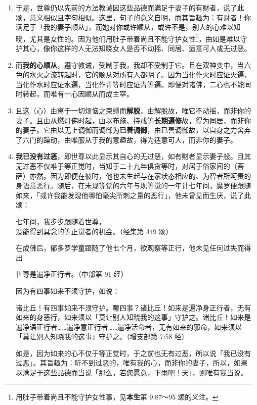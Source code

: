 \begin{enumerate}\item 于是，世尊仍以先前的方法教诫因这些品德而满足于妻子的有财者，说了此颂，意义相似且字句相似。这里，句子的意义自明，而其旨趣为：有财者！你满足于「我的妻子顺从」，而她对你或许顺从，或许不是，别人的心难以知晓，尤其是女性的。因为他们用肚子带着尚且不能守护女性\footnote{用肚子带着尚且不能守护女性事，见\textbf{本生}第 9:87～95 颂的义注。}，由如是难以守护其心，像你这样的人无法知晓女人是否不动摇、同居、适意可人或无过恶。
\item 而\textbf{我的心顺从}，遵守教诫，受制于我，我却不受制于它。且在双神变中，当六色的水火之流转起时，它的顺从对所有人都明了。因为当化作火时应证火遍，当化作水时应证水遍，当化作青等时应证青等遍。即便对诸佛，二心也不能同时转起，而唯有一心因顺从而成主宰。
\item 且这（心）由离于一切烦恼之束缚而\textbf{解脱}，由解脱故，唯它不动摇，而非你的妻子。且由从燃灯佛时起，由以布施、持戒等\textbf{长期遍修}故，得为同居，而非你的妻子。它由以无上调御而调御为\textbf{已善调御}，由已善调御故，以自身之力舍弃了六门的躁动，由唯服从于我的意趣故，得为适意可人，而非你的妻子。
\item \textbf{我已没有过恶}，即世尊以此显示其自心的无过恶，如有财者显示妻子般。且其无过恶不仅唯于等正觉时，当知于二十九年俱贪等时，对居于俗家间的（菩萨）亦然。因为即便在彼时，他也未生起与在家状态相应的、为智者所呵责的身语意恶行。随后，在未现等觉的六年与现等觉的一年计七年间，魔罗便跟随如来，「或许我能发现他哪怕毫尖所刺之量的恶行」，他未曾见而生厌，说了此颂：\begin{quoting}七年间，我步步跟随着世尊，\\没能得到具念的等正觉者的机会。（经集第 449 颂）\end{quoting}在成佛后，郁多罗学童跟随了他七个月，欲观察等正行，他未见任何过失而得出\begin{quoting}世尊是遍净正行者。（中部第 91 经）\end{quoting}因为有四事如来不须守护，如说：\begin{quoting}诸比丘！有四事如来不须守护。哪四事？诸比丘！如来是遍净身正行者，无有如来的身恶行，如来须以「莫让别人知晓我的这事」守护之。诸比丘！如来是遍净语正行者……遍净意正行者……遍净活命者，无有如来的邪命，如来须以「莫让别人知晓我的这事」守护之。（增支部第 7:58 经）\end{quoting}如是，因为如来的心不仅于等正觉时，于之前也无有过恶，所以说「我已没有过恶」。其旨趣为：听不到过恶的，唯有我的心，而非你的妻子，所以，如果以满足于这些品德而当说「那么，若您愿意，下雨吧！天」，则唯有我当说。\end{enumerate}

